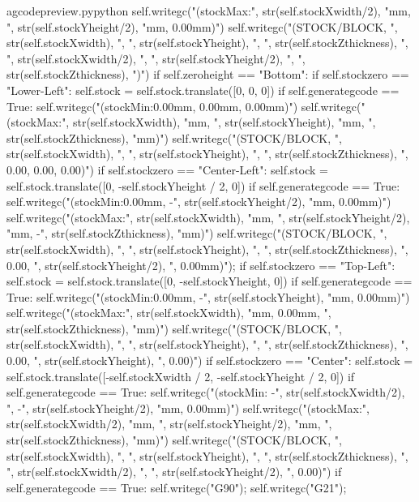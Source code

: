 \documentclass{ltxdoc}
\begin{document}
\begin{writecode}{a}{gcodepreview.py}{python}
                    self.writegc("(stockMax:", str(self.stockXwidth/2), "mm, ", str(self.stockYheight/2), "mm, 0.00mm)")
                    self.writegc("(STOCK/BLOCK, ", str(self.stockXwidth), ", ", str(self.stockYheight), ", ", str(self.stockZthickness), ", ", str(self.stockXwidth/2), ", ", str(self.stockYheight/2), ", ", str(self.stockZthickness), ")")
        if self.zeroheight == "Bottom":
            if self.stockzero == "Lower-Left":
                 self.stock = self.stock.translate([0, 0, 0])
                 if self.generategcode == True:
                     self.writegc("(stockMin:0.00mm, 0.00mm, 0.00mm)")
                     self.writegc("(stockMax:", str(self.stockXwidth), "mm, ", str(self.stockYheight), "mm, ", str(self.stockZthickness), "mm)")
                     self.writegc("(STOCK/BLOCK, ", str(self.stockXwidth), ", ", str(self.stockYheight), ", ", str(self.stockZthickness), ", 0.00, 0.00, 0.00)")
            if self.stockzero == "Center-Left":
                self.stock = self.stock.translate([0, -self.stockYheight / 2, 0])
                if self.generategcode == True:
                    self.writegc("(stockMin:0.00mm, -", str(self.stockYheight/2), "mm, 0.00mm)")
                    self.writegc("(stockMax:", str(self.stockXwidth), "mm, ", str(self.stockYheight/2), "mm, -", str(self.stockZthickness), "mm)")
                    self.writegc("(STOCK/BLOCK, ", str(self.stockXwidth), ", ", str(self.stockYheight), ", ", str(self.stockZthickness), ", 0.00, ", str(self.stockYheight/2), ", 0.00mm)");
            if self.stockzero == "Top-Left":
                self.stock = self.stock.translate([0, -self.stockYheight, 0])
                if self.generategcode == True:
                    self.writegc("(stockMin:0.00mm, -", str(self.stockYheight), "mm, 0.00mm)")
                    self.writegc("(stockMax:", str(self.stockXwidth), "mm, 0.00mm, ", str(self.stockZthickness), "mm)")
                    self.writegc("(STOCK/BLOCK, ", str(self.stockXwidth), ", ", str(self.stockYheight), ", ", str(self.stockZthickness), ", 0.00, ", str(self.stockYheight), ", 0.00)")
            if self.stockzero == "Center":
                self.stock = self.stock.translate([-self.stockXwidth / 2, -self.stockYheight / 2, 0])
                if self.generategcode == True:
                    self.writegc("(stockMin: -", str(self.stockXwidth/2), ", -", str(self.stockYheight/2), "mm, 0.00mm)")
                    self.writegc("(stockMax:", str(self.stockXwidth/2), "mm, ", str(self.stockYheight/2), "mm, ", str(self.stockZthickness), "mm)")
                    self.writegc("(STOCK/BLOCK, ", str(self.stockXwidth), ", ", str(self.stockYheight), ", ", str(self.stockZthickness), ", ", str(self.stockXwidth/2), ", ", str(self.stockYheight/2), ", 0.00)")
        if self.generategcode == True:
            self.writegc("G90");
            self.writegc("G21");

\end{writecode}
\addtocounter{gcpy}{54}
\end{document}
